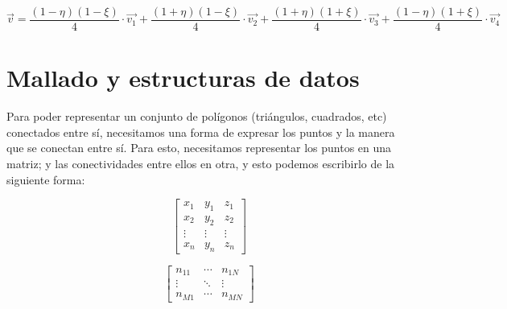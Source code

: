 \begin{equation}
\label{eq:vdechieta}  
  \vec{v} = 
  \frac{ (1-\eta)(1-\xi) }{4} \cdot \vec{v_1} + 
  \frac{ (1+\eta)(1-\xi) }{4} \cdot \vec{v_2} + 
  \frac{ (1+\eta)(1+\xi) }{4} \cdot \vec{v_3} +  
  \frac{ (1-\eta)(1+\xi) }{4} \cdot \vec{v_4} 
\end{equation} 

 \section{Mallado y estructuras de datos}
 \label{sec:mallado}

Para poder representar un conjunto de polígonos (triángulos, cuadrados, etc) conectados entre sí, necesitamos una forma de expresar los puntos y la manera que se conectan entre sí. Para esto, necesitamos representar los puntos en una matriz; y las conectividades entre ellos en otra, y esto podemos escribirlo de la siguiente forma:

\begin{equation}
  \label{eq:xnode}
  \begin{bmatrix}
    x_1 & y_1 & z_1 \\
    x_2 & y_2 & z_2 \\
    \vdots & \vdots & \vdots \\
    x_n & y_n & z_n
  \end{bmatrix}
\end{equation}

\begin{equation}
  \label{eq:icone}
  \begin{bmatrix}
    n_{11} & \cdots & n_{1N} \\
    \vdots & \ddots & \vdots \\
    n_{M1} & \cdots & n_{MN}
  \end{bmatrix}
\end{equation}

